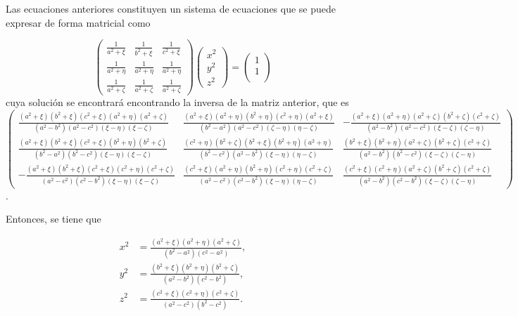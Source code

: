 \documentclass[paper=letter, fontsize=12pt,]{article}
\begin{document}
Las ecuaciones anteriores constituyen un sistema de ecuaciones que se puede expresar de forma matricial como

\begin{equation*}
    \begin{pmatrix}
    \frac{1}{a^2+\xi} & \frac{1}{b^2+\xi} & \frac{1}{c^2+\xi}\\
    \frac{1}{a^2+\eta} & \frac{1}{a^2+\eta} & \frac{1}{a^2+\eta}\\
    \frac{1}{a^2+\zeta} & \frac{1}{a^2+\zeta} & \frac{1}{a^2+\zeta}\end{pmatrix}\begin{pmatrix}
        x^2\\
        y^2\\
        z^2
    \end{pmatrix}=\begin{pmatrix}
        1\\
        1\\
    \end{pmatrix}
\end{equation*}
cuya solución se encontrará encontrando la inversa de la matriz anterior, que es \cite{Miguel}
\begin{equation*}
    \begin{pmatrix}
        \frac{(a^2+\xi)(b^2+\xi)(c^2+\xi)(a^2+\eta)(a^2+\zeta)}{(a^2-b^2)(a^2-c^2)(\xi-\eta)(\xi-\zeta)} & \frac{(a^2+\xi)(a^2+\eta)(b^2+\eta)(c^2+\eta)(a^2+\xi)}{(b^2-a^2)(a^2-c^2)(\zeta-\eta)(\eta-\zeta)} & -\frac{(a^2+\xi)(a^2+\eta)(a^2+\zeta)(b^2+\zeta)(c^2+\zeta)}{(a^2-b^2)(a^2-c^2)(\xi-\zeta)(\zeta-\eta)}\\
        \frac{(a^2+\xi)(b^2+\xi)(c^2+\xi)(b^2+\eta)(b^2+\zeta)}{(b^2-a^2)(b^2-c^2)(\xi-\eta)(\xi-\zeta)} &\frac{(c^2+\eta)(b^2+\zeta)(b^2+\xi)(b^2+\eta)(a^2+\eta)}{(b^2-c^2)(a^2-b^2)(\xi-\eta)(\eta-\zeta)} &\frac{(b^2+\xi)(b^2+\eta)(a^2+\zeta)(b^2+\zeta)(c^2+\zeta)}{(a^2-b^2)(b^2-c^2)(\xi-\zeta)(\zeta-\eta)}\\
        -\frac{(a^2+\xi)(b^2+\xi)(c^2+\xi)(c^2+\eta)(c^2+\zeta)}{(a^2-c^2)(c^2-b^2)(\xi-\eta)(\xi-\zeta)} & \frac{(c^2+\xi)(a^2+\eta)(b^2+\eta)(c^2+\eta)(c^2+\zeta)}{(a^2-c^2)(c^2-b^2)(\xi-\eta)(\eta-\zeta)} &
        \frac{(c^2+\xi)(c^2+\eta)(a^2+\zeta)(b^2+\zeta)(c^2+\zeta)}{(a^2-b^2)(c^2-b^2)(\xi-\zeta)(\zeta-\eta)}
    \end{pmatrix}
\end{equation*}.

Entonces, se tiene que

\begin{align}
    x^2&=\frac{(a^2+\xi)(a^2+\eta)(a^2+\zeta)}{(b^2-a^2)(c^2-a^2)},\label{def_x}\\
     y^2&=\frac{(b^2+\xi)(b^2+\eta)(b^2+\zeta)}{(a^2-b^2)(c^2-b^2)},\\
     z^2&=\frac{(c^2+\xi)(c^2+\eta)(c^2+\zeta)}{(a^2-c^2)(b^2-c^2)}.    
\end{align}
\end{document}
